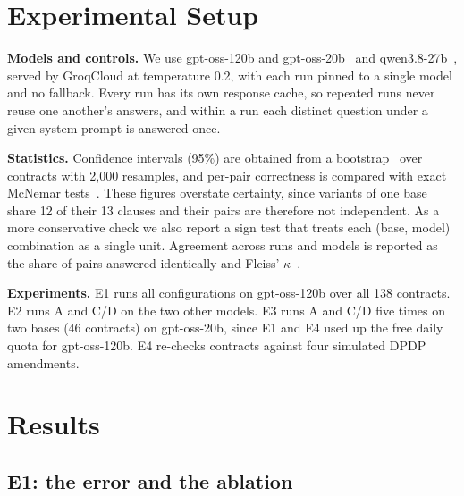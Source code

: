 \documentclass[conference]{IEEEtran}
\begin{document}
\section{Experimental Setup}

\textbf{Models and controls.} We use gpt-oss-120b and gpt-oss-20b~\cite{openai2025gptoss} and qwen3.8-27b~\cite{qwen}, served by GroqCloud at temperature 0.2, with each run pinned to a single model and no fallback. Every run has its own response cache, so repeated runs never reuse one another's answers, and within a run each distinct question under a given system prompt is answered once.

\textbf{Statistics.} Confidence intervals (95\%) are obtained from a bootstrap~\cite{efron1993bootstrap} over contracts with 2,000 resamples, and per-pair correctness is compared with exact McNemar tests~\cite{mcnemar1947}. These figures overstate certainty, since variants of one base share 12 of their 13 clauses and their pairs are therefore not independent. As a more conservative check we also report a sign test that treats each (base, model) combination as a single unit. Agreement across runs and models is reported as the share of pairs answered identically and Fleiss' $\kappa$~\cite{fleiss1971}.

\textbf{Experiments.} E1 runs all configurations on gpt-oss-120b over all 138 contracts. E2 runs A and C/D on the two other models. E3 runs A and C/D five times on two bases (46 contracts) on gpt-oss-20b, since E1 and E4 used up the free daily quota for gpt-oss-120b. E4 re-checks contracts against four simulated DPDP amendments.

\section{Results}

\subsection{E1: the error and the ablation}
\end{document}
